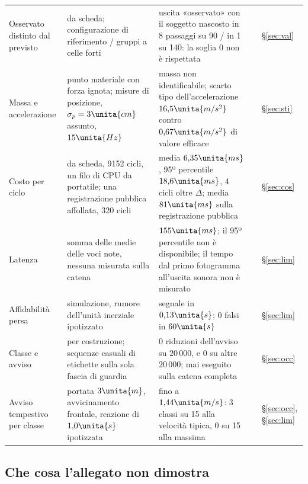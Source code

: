 \begin{table}[p]
\begin{tabularx}{\textwidth}{@{}>{\RaggedRight\arraybackslash}p{2.8cm}>{\RaggedRight\arraybackslash}p{4.1cm}L>{\RaggedRight\arraybackslash}p{1.2cm}>{\RaggedRight\arraybackslash}p{1.05cm}@{}}
Osservato distinto dal previsto & da scheda; configurazione di riferimento / gruppi a celle forti & uscita «osservato» con il soggetto nascosto in 8 passaggi su 90 / in 1 su 140: la soglia 0 non è rispettata &  & \S\ref{sec:val}\\
Massa e accelerazione & punto materiale con forza ignota; misure di posizione, $\sigma_p=3\unita{cm}$ assunto, $15\unita{Hz}$ & massa non identificabile; scarto tipo dell'accelerazione $16{,}5\unita{m/s^2}$ contro $0{,}67\unita{m/s^2}$ di valore efficace &  & \S\ref{sec:sti}\\
Costo per ciclo & da scheda, 9152 cicli, un filo di CPU da portatile; una registrazione pubblica affollata, 320 cicli & media $6{,}35\unita{ms}$, 95º percentile $18{,}6\unita{ms}$, 4 cicli oltre $\Delta$; media $81\unita{ms}$ sulla registrazione pubblica &  & \S\ref{sec:cos}\\
Latenza & somma delle medie delle voci note, nessuna misurata sulla catena & $155\unita{ms}$; il 95º percentile non è disponibile; il tempo dal primo fotogramma all'uscita sonora non è misurato &  & \S\ref{sec:lim}\\
Affidabilità persa & simulazione, rumore dell'unità inerziale ipotizzato & segnale in $0{,}13\unita{s}$; 0 falsi in $60\unita{s}$ &  & \S\ref{sec:lim}\\
Classe e avviso & per costruzione; sequenze casuali di etichette sulla sola fascia di guardia & 0 riduzioni dell'avviso su $20\,000$, e 0 su altre $20\,000$; mai eseguito sulla catena completa &  & \S\ref{sec:occ}\\
Avviso tempestivo per classe & portata $3\unita{m}$, avvicinamento frontale, reazione di $1{,}0\unita{s}$ ipotizzata & fino a $1{,}44\unita{m/s}$: 3 classi su 15 alla velocità tipica, 0 su 15 alla massima &  & \S\ref{sec:occ}, \S\ref{sec:lim}\\
\bottomrule
\end{tabularx}
\end{table}

\subsection{Che cosa l'allegato non dimostra}\label{sec:intro-limiti}


